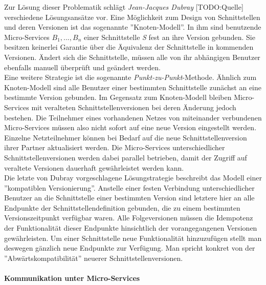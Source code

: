 Zur Lösung dieser Problematik schlägt \textit{Jean-Jacques Dubray} [TODO:Quelle] verschiedene Lösungsansätze vor. Eine Möglichkeit zum Design von Schnittstellen und deren Versionen ist das sogenannte ''Knoten-Modell''. In ihm sind benutzende Micro-Services $B_1, ..., B_n$ einer Schnittstelle \textit{S} fest an ihre Version gebunden. Sie besitzen keinerlei Garantie über die Äquivalenz der Schnittstelle in kommenden Versionen. Ändert sich die Schnittstelle, müssen alle von ihr abhängigen Benutzer ebenfalls manuell überprüft und geändert werden. 
\\
Eine weitere Strategie ist die sogenannte \textit{Punkt-zu-Punkt}-Methode. Ähnlich zum Knoten-Modell sind alle Benutzer einer bestimmten Schnittstelle zunächst an eine bestimmte Version gebunden. Im Gegensatz zum Knoten-Modell bleiben Micro-Services mit veralteten Schnittstellenversionen bei deren Änderung jedoch bestehen. Die Teilnehmer eines vorhandenen Netzes von miteinander verbundenen Micro-Services müssen also nicht sofort auf eine neue Version eingestellt werden. Einzelne Netzteilnehmer können bei Bedarf auf die neue Schnittstellenversion ihrer Partner aktualisiert werden. Die Micro-Services unterschiedlicher Schnittstellenversionen werden dabei parallel betrieben, damit der Zugriff auf veraltete Versionen dauerhaft gewährleistet werden kann.
\\
Die letzte von Dubray vorgeschlagene Lösungstrategie beschreibt das Modell einer ''kompatiblen Versionierung''. Anstelle einer festen Verbindung unterschiedlicher Benutzer an die Schnittstelle einer bestimmten Version sind letztere hier an alle Endpunkte der Schnittstellendefinition gebunden, die zu einem bestimmten Versionszeitpunkt verfügbar waren. Alle Folgeversionen müssen die Idempotenz der Funktionalität dieser Endpunkte hinsichtlich der vorangegangenen Versionen gewährleisten. Um einer Schnittstelle neue Funktionalität hinzuzufügen stellt man deswegen gänzlich neue Endpunkte zur Verfügung. Man spricht konkret von der ''Abwärtskompatibilität'' neuerer Schnittstellenversionen.

\paragraph{Kommunikation unter Micro-Services}\label{grundlagen:microcomms}
\mbox{}\\

